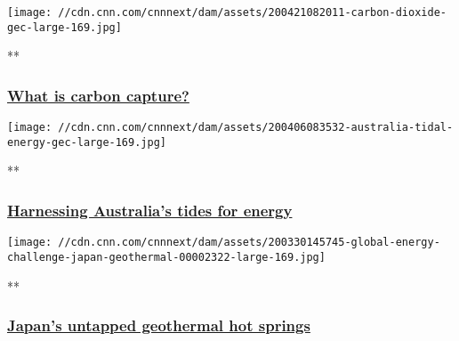 \href{/videos/business/2020/04/21/carbon-capture-explainer-gec.cnn-business/video/playlists/business-global-energy-challenge/}{}

\texttt{[image: //cdn.cnn.com/cnnnext/dam/assets/200421082011-carbon-dioxide-gec-large-169.jpg]}

**

\hypertarget{what-is-carbon-capture}{%
\subsubsection{\texorpdfstring{\href{/videos/business/2020/04/21/carbon-capture-explainer-gec.cnn-business/video/playlists/business-global-energy-challenge/}{What
is carbon
capture?}}{What is carbon capture?}}\label{what-is-carbon-capture}}

\href{/videos/business/2020/04/06/australia-tidal-energy-gec.cnn-business/video/playlists/business-global-energy-challenge/}{}

\texttt{[image: //cdn.cnn.com/cnnnext/dam/assets/200406083532-australia-tidal-energy-gec-large-169.jpg]}

**

\hypertarget{harnessing-australias-tides-for-energy}{%
\subsubsection{\texorpdfstring{\href{/videos/business/2020/04/06/australia-tidal-energy-gec.cnn-business/video/playlists/business-global-energy-challenge/}{Harnessing
Australia's tides for
energy}}{Harnessing Australia's tides for energy}}\label{harnessing-australias-tides-for-energy}}

\href{/videos/business/2020/03/30/global-energy-challenge-japan-geothermal.cnn/video/playlists/business-global-energy-challenge/}{}

\texttt{[image: //cdn.cnn.com/cnnnext/dam/assets/200330145745-global-energy-challenge-japan-geothermal-00002322-large-169.jpg]}

**

\hypertarget{japans-untapped-geothermal-hot-springs}{%
\subsubsection{\texorpdfstring{\href{/videos/business/2020/03/30/global-energy-challenge-japan-geothermal.cnn/video/playlists/business-global-energy-challenge/}{Japan's
untapped geothermal hot
springs}}{Japan's untapped geothermal hot springs}}\label{japans-untapped-geothermal-hot-springs}}

